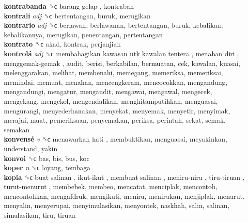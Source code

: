 \textbf{kontrabanda} ␝ϲ   barang gelap , kontraban  \\
\textbf{kontrali} \emph{adj}  ␝ϲ  bertentangan, buruk, merugikan  \\
\textbf{kontrario} \emph{adj}  ␝ϲ  berlawan, berlawanan, bertentangan, buruk, kebalikan, kebalikannya, merugikan, penentangan, pertentangan  \\
\textbf{kontrato} ␝ϲ  akad, kontrak, perjanjian  \\
\textbf{kontrolá} \emph{adj}  ␝ϲ   membahagikan kawasan utk kawalan tentera ,  menahan diri ,  menggemak-gemak , audit, berisi, berkabilan, bermuatan, cek, kawalan, kuasai, melenggarakan, melihat, membenahi, memegang, memeriksa, memeriksai, memindai, memuat, menahan, mencengkeram, mencocokkan, mengandung, mengandungi, mengatur, mengaudit, mengawai, mengawal, mengecek, mengekang, mengekol, mengendalikan, menghitamputihkan, menguasai, mengurangi, menyederhanakan, menyekat, menyemak, menyetir, menyimak, merajai, muat, pemeriksaan, penyemakan, periksa, perintah, sekat, semak, semakan  \\
\textbf{konvensé} \emph{v}  ␝ϲ   menawarkan hati , membuktikan, menguasai, meyakinkan, understand, yakin  \\
\textbf{konvoi} ␝ϲ  bas, bis, bus, koc  \\
\textbf{koper} \emph{n}  ␝ϲ  loyang, tembaga  \\
\textbf{kopia} ␝ϲ   buat salinan ,  ikut-ikut ,  membuat salinan ,  meniru-niru ,  tiru-tiruan ,  turut-menurut , membebek, membeo, mencatat, menciplak, mencontoh, mencontohkan, mengafdruk, mengikuti, meniru, menirukan, menjiplak, menurut, menyalin, menyerupai, menyimulasikan, menyontek, naskhah, salin, salinan, simulasikan, tiru, tiruan  \\
